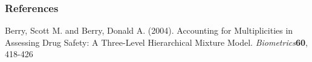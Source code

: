 \documentclass{beamer}[10]
\begin{document}
\begin{frame}[allowframebreaks]
  \frametitle<presentation>{References}
    
\begin{thebibliography}{10}
%    
 \beamertemplatebookbibitems
 
 Berry, Scott M. and Berry, Donald A. (2004). Accounting for Multiplicities in Assessing Drug Safety: A Three-Level Hierarchical Mixture Model. \emph{Biometrics}{\bf 60}, 418-426

%
%
%
%
%
%
%
%
%
%


\end{thebibliography}
\end{frame}
\end{document}
